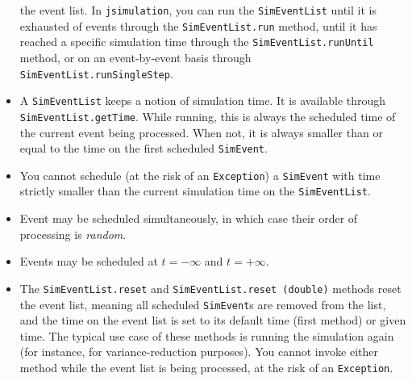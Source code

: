 \begin{itemize}
  the event list.
  In \lstinline|jsimulation|,
  you can run the \lstinline|SimEventList| until it is exhausted
  of events through the \lstinline|SimEventList.run| method,
  until it has reached a specific simulation time
  through the \lstinline|SimEventList.runUntil| method,
  or on an event-by-event basis through \lstinline|SimEventList.runSingleStep|.
\item A \lstinline|SimEventList| keeps a notion of simulation time.
  It is available through \lstinline|SimEventList.getTime|.
  While running,
  this is always the scheduled time of the current event being processed.
  When not, it is always smaller than or equal to the time
  on the first scheduled \lstinline|SimEvent|.
\item You cannot schedule (at the risk of an \lstinline|Exception|)
  a \lstinline|SimEvent| with time
  strictly smaller than the current simulation time
  on the \lstinline|SimEventList|.
\item Event may be scheduled simultaneously,
  in which case their order of processing is {\em random}.
\item Events may be scheduled at $t=-\infty$ and $t=+\infty$.
\item The \lstinline|SimEventList.reset|
  and \lstinline|SimEventList.reset (double)|
  methods reset the event list,
  meaning all scheduled \lstinline|SimEvent|s are removed from the list,
  and the time on the event list is set to its default time (first method)
  or given time.
  The typical use case of these methods is running the simulation again
  (for instance, for variance-reduction purposes).
  You cannot invoke either method while the event list is being processed,
  at the risk of an \lstinline|Exception|.
\end{itemize}